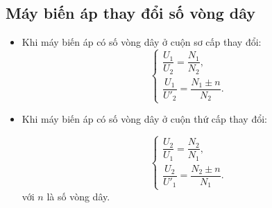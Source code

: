 \subsection{Máy biến áp thay đổi số vòng dây}
\begin{itemize}
	\item Khi máy biến áp có số vòng dây ở cuộn sơ cấp thay đổi:
	\begin{equation*}
		\begin{cases}
			\dfrac{U_1}{U_2}=\dfrac{N_1}{N_2}, \\ 
			\dfrac{U_1}{U'_2}=\dfrac{N_1 \pm n }{N_2}.
		\end{cases}
	\end{equation*}
	
	\item Khi máy biến áp có số vòng dây ở cuộn thứ cấp thay đổi:
	
	\begin{equation*}
		\begin{cases}
			\dfrac{U_2}{U_1}=\dfrac{N_2}{N_1}, \\ 
			\dfrac{U_2}{U'_1}=\dfrac{N_2 \pm n }{N_1}.
		\end{cases}
	\end{equation*}
	với $n$ là số vòng dây. 
\end{itemize}

